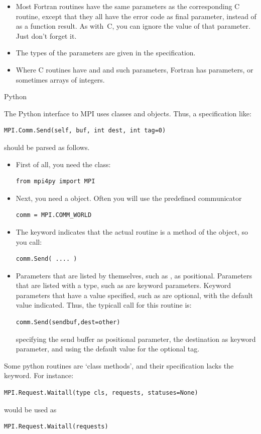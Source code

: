 \begin{itemize}
\item Most Fortran routines have the same parameters as the
  corresponding C routine, except that they all have the error code as
  final parameter, instead of as a function result. As with~C, you can
  ignore the value of that parameter. Just don't forget it.
\item The types of the parameters are given in the specification.
\item Where C routines have  and  and such
  parameters, Fortran has  parameters, or sometimes arrays
  of integers.
\end{itemize}

 {Python}

The Python interface to MPI uses classes and objects. Thus, a
specification like:
\lstset{language=Python} %
\begin{lstlisting}
MPI.Comm.Send(self, buf, int dest, int tag=0)
\end{lstlisting}
should be parsed as follows.
\begin{itemize}
\item First of all, you need the  class:
\begin{lstlisting}
from mpi4py import MPI
\end{lstlisting}
\item Next, you need a  object. Often you will use the
  predefined communicator
\begin{lstlisting}
comm = MPI.COMM_WORLD
\end{lstlisting}
\item The keyword  indicates that the actual routine 
  is a method of the  object, so you call:
\begin{lstlisting}
comm.Send( .... )
\end{lstlisting}
\item Parameters that are listed by themselves, such as , as
  positional. Parameters that are listed with a type, such as  are keyword parameters. Keyword parameters that have a value
  specified, such as  are optional, with the default
  value indicated. Thus, the typicall call for this routine is:
\begin{lstlisting}
comm.Send(sendbuf,dest=other)
\end{lstlisting}
  specifying the send buffer as positional parameter, the destination
  as keyword parameter, and using the default value for the optional tag.
\end{itemize}
Some python routines are `class methods', and their specification
lacks the  keyword. For instance:
\begin{lstlisting}
MPI.Request.Waitall(type cls, requests, statuses=None)
\end{lstlisting}
would be used as
\begin{lstlisting}
MPI.Request.Waitall(requests)
\end{lstlisting}
\lstset{language=C} %

